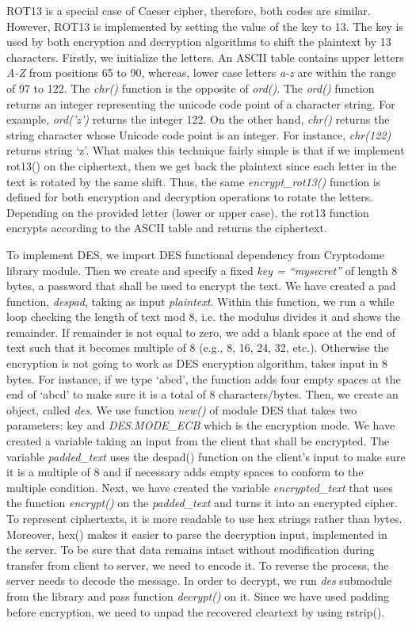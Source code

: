 ROT13 is a special case of Caeser cipher, therefore, both codes are similar. However, ROT13 is implemented by setting the value of the key to 13. The key is used by both encryption and decryption algorithms to shift the plaintext by 13 characters. Firstly, we initialize the letters. An ASCII table contains upper letters \textit{A-Z} from positions 65 to 90, whereas, lower case letters \textit{a-z} are within the range of 97 to 122. The \textit{chr()} function is the opposite of \textit{ord()}. The \textit{ord()} function returns an integer representing the unicode code point of a character string. For example, \textit{ord('z')} returns the integer 122. On the other hand, \textit{chr()} returns the string character whose Unicode code point is an integer. For instance, \textit{chr(122)} returns string ‘z’. What makes this technique fairly simple is that if we implement rot13() on the ciphertext, then we get back the plaintext since each letter in the text is rotated by the same shift. Thus, the same \textit{encrypt\_rot13()} function is defined for both encryption and decryption operations to rotate the letters. Depending on the provided letter (lower or upper case), the rot13 function encrypts according to the ASCII table and returns the ciphertext. 

To implement DES, we import DES functional dependency from Cryptodome library module. Then we create and specify a fixed \textit{key = “mysecret”} of length 8 bytes, a password that shall be used to encrypt the text. We have created a pad function, \textit{despad}, taking as input \textit{plaintext}. Within this function, we run a while loop checking the length of text mod 8, i.e. the modulus divides it and shows the remainder. If remainder is not equal to zero, we add a blank space at the end of text such that it becomes multiple of 8 (e.g., 8, 16, 24, 32, etc.). Otherwise the encryption is not going to work as DES encryption algorithm, takes input in 8 bytes. For instance, if we type ‘abcd’, the function adds four empty spaces at the end of ‘abcd’ to make sure it is a total of 8 characters/bytes. Then, we create an object, called \textit{des}. We use function \textit{new()} of module DES that takes two parameters: key and \textit{DES.MODE\_ECB} which is the encryption mode. We have created a variable taking an input from the client that shall be encrypted. The variable  \textit{padded\_text} uses the despad() function on the client's input to make sure it is a multiple of 8 and if necessary adds empty spaces to conform to the multiple condition. Next, we have created the variable \textit{encrypted\_text} that uses the function \textit{encrypt()} on the \textit{padded\_text} and turns it into an encrypted cipher. To represent ciphertexts, it is more readable to use hex strings rather than bytes. Moreover, hex() makes it easier to parse the decryption input, implemented in the server. To be sure that data remains intact without modification during transfer from client to server, we need to encode it. To reverse the process, the server needs to decode the message. In order to decrypt, we run \textit{des} submodule from the library and pass function  \textit{decrypt()} on it. Since we have used padding before encryption, we need to unpad the recovered cleartext by using rstrip(). 

